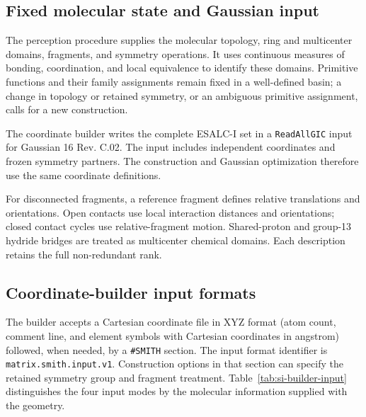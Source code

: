 \documentclass[10pt]{article}
\begin{document}
\subsection{Fixed molecular state and Gaussian input}

The perception procedure supplies the molecular topology, ring and
multicenter domains, fragments, and symmetry operations. It uses continuous measures of bonding,
coordination, and local equivalence to identify these domains. Primitive
functions and their family assignments remain fixed in a well-defined
basin; a change in topology or retained symmetry, or an ambiguous primitive
assignment, calls for a new construction.

The coordinate builder writes the complete ESALC-I set in a
\texttt{ReadAllGIC} input for Gaussian 16 Rev. C.02. The input
includes independent coordinates and frozen symmetry partners. The
construction and Gaussian optimization therefore use the same coordinate
definitions.

For disconnected fragments, a reference fragment defines relative
translations and orientations. Open contacts use local interaction
distances and orientations; closed contact cycles use relative-fragment
motion. Shared-proton and group-13 hydride bridges are treated as
multicenter chemical domains. Each description retains the full
non-redundant rank.

\subsection{{Coordinate-builder input formats}}

{The builder accepts a Cartesian coordinate file in XYZ format (atom count, comment line, and
element symbols with Cartesian coordinates in angstrom) followed, when
needed, by a \texttt{\#SMITH} section. The input format identifier is
\nolinkurl{matrix.smith.input.v1}. Construction options in that section can
specify the retained symmetry group and fragment treatment.
Table~\ref{tab:si-builder-input} distinguishes the four input modes by the
molecular information supplied with the geometry.}
\end{document}
